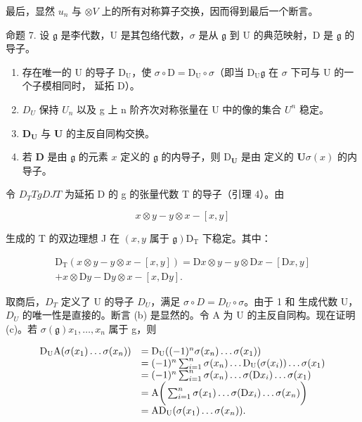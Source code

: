 最后，显然 \(u_{n}\) 与 \(\otimes V\) 上的所有对称算子交换，因而得到最后一个断言。

命题 7. 设 \(\mathfrak{g}\) 是李代数，U 是其包络代数，\(\sigma\) 是从 \(\mathfrak{g}\) 到 U 的典范映射，D 是 \(\mathfrak{g}\) 的导子。

\begin{enumerate}
\def\labelenumi{(\alph{enumi})}
\item
  存在唯一的 U 的导子 \(\mathrm{D_U}\)，使 \(\sigma \circ \mathrm{D} = \mathrm{D_U} \circ \sigma\)（即当 \(\mathrm{D_U}\)\(\mathfrak{g}\) 在 \(\sigma\) 下可与 U 的一个子模相同时， 延拓 D）。
\item
  \(D_{U}\) 保持 \(U_{n}\) 以及 g 上 n 阶齐次对称张量在 U 中的像的集合 \(U^{n}\) 稳定。
\item
  \(\mathbf{D}_{\mathbf{U}}\) 与 \(\mathbf{U}\) 的主反自同构交换。
\item
  若 \(\mathbf{D}\) 是由 \(\mathfrak{g}\) 的元素 \(x\) 定义的 \(\mathfrak{g}\) 的内导子，则 \(\mathrm{D}_{\mathbf{U}}\) 是由  定义的 \(\mathbf{U}\)\(\sigma(x)\) 的内导子。
\end{enumerate}

令 \(D_T\)\(T\)\(g\)\(D\)\(J\)\(T\) 为延拓 D 的 g 的张量代数 T 的导子（引理 4）。由

\[
x \otimes y - y \otimes x - [ x, y ]
\]

生成的 T 的双边理想 J 在 \((x,y \text{ 属于 } \mathfrak{g})\)\(\mathrm{D}_{\mathrm{T}}\) 下稳定。其中：

\[
\begin{array}{r} \mathrm{D} _ {\mathrm{T}} (x \otimes y - y \otimes x - [ x, y ]) = \mathrm{D} x \otimes y - y \otimes \mathrm{D} x - [ \mathrm{D} x, y ] \\ + x \otimes \mathrm{D} y - \mathrm{D} y \otimes x - [ x, \mathrm{D} y ]. \end{array}
\]

取商后，\(D_{T}\) 定义了 U 的导子 \(D_{U}\)，满足 \(\sigma \circ D = D_{U} \circ \sigma\)。由于 1 和  生成代数 U，\(D_{U}\) 的唯一性是直接的。断言 (b) 是显然的。令 A 为 U 的主反自同构。现在证明 (c)。若 \(\sigma(\mathfrak{g})\)\(x_{1}, \ldots, x_{n}\) 属于 g，则

\[
\begin{array}{r l} \mathrm{D} _ {\mathrm{U}} \mathrm{A} (\sigma (x _ {1}) \dots \sigma (x _ {n})) & = \mathrm{D} _ {\mathrm{U}} ((- 1) ^ {n} \sigma (x _ {n}) \dots \sigma (x _ {1})) \\ & = (- 1) ^ {n} \sum_ {i = 1} ^ {n} \sigma (x _ {n}) \dots \mathrm{D} _ {\mathrm{U}} (\sigma (x _ {i})) \dots \sigma (x _ {1}) \\ & = (- 1) ^ {n} \sum_ {i = 1} ^ {n} \sigma (x _ {n}) \dots \sigma (\mathrm{D} x _ {i}) \dots \sigma (x _ {1}) \\ & = \mathrm{A} \bigg (\sum_ {i = 1} ^ {n} \sigma (x _ {1}) \dots \sigma (\mathrm{D} x _ {i}) \dots \sigma (x _ {n}) \bigg) \\ & = \mathrm{AD} _ {\mathrm{U}} (\sigma (x _ {1}) \dots \sigma (x _ {n})). \end{array}
\]

